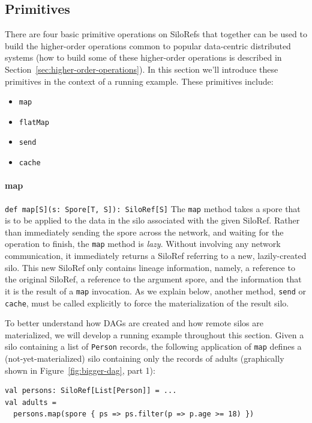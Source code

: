 \documentclass[preprint]{sigplanconf}
\theoremstyle{definition}
\theoremstyle{definition}
\begin{document}
\subsection{Primitives}
\label{sec:primitives}

There are four basic primitive operations on SiloRefs that together can be
used to build the higher-order operations common to popular data-centric
distributed systems (how to build some of these higher-order operations is
described in Section~\ref{sec:higher-order-operations}). In this section we'll
introduce these primitives in the context of a running example. These
primitives include:

\begin{itemize}[noitemsep,nolistsep]
\item \verb|map|
\item \verb|flatMap|
\item \verb|send|
\item \verb|cache|
\end{itemize}

\paragraph{map} \texttt{def map[S](s: Spore[T, S]): SiloRef[S]}
\newline The \verb|map| method takes a spore that is to be applied to the data
in the silo associated with the given SiloRef. Rather than immediately sending
the spore across the network, and waiting for the operation to finish, the
\verb|map| method is \emph{lazy}. Without involving any network communication,
it immediately returns a SiloRef referring to a new, lazily-created silo. This
new SiloRef only contains lineage information, namely, a reference to the
original SiloRef, a reference to the argument spore, and the information that
it is the result of a \verb|map| invocation. As we explain below, another
method, \verb|send| or \verb|cache|, must be called explicitly to force the
materialization of the result silo.

To better understand how DAGs are created and how remote silos are
materialized, we will develop a running example throughout this section. Given
a silo containing a list of \verb|Person| records, the following application
of \verb|map| defines a (not-yet-materialized) silo containing only the
records of adults (graphically shown in Figure~\ref{fig:bigger-dag}, part 1):

\begin{lstlisting}
val persons: SiloRef[List[Person]] = ...
val adults =
  persons.map(spore { ps => ps.filter(p => p.age >= 18) })
\end{lstlisting}
\end{document}
